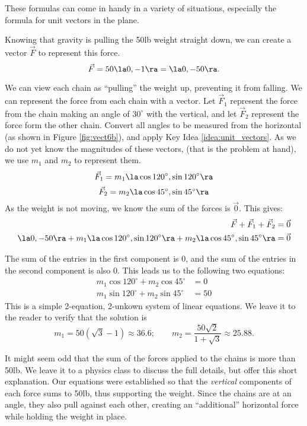 These formulas can come in handy in a variety of situations, especially the formula for unit vectors in the plane.



{Knowing that gravity is pulling the 50lb weight straight down, we can create a vector $\vec F$ to represent this force. 
$$\vec F = 50\la 0,-1\ra = \la 0,-50\ra.$$

We can view each chain as ``pulling'' the weight up, preventing it from falling. We can represent the force from each chain with a vector. Let $\vec F_1$ represent the force from the chain making an angle of $30^\circ$ with the vertical, and let $\vec F_2$ represent the force form the other chain. Convert all angles to be measured from the horizontal (as shown in Figure \ref{fig:vect6b}), and apply Key Idea \ref{idea:unit_vectors}. As we do not yet know the magnitudes of these vectors, (that is the problem at hand), we use $m_1$ and $m_2$ to represent them.
$$\vec F_1 = m_1\la \cos 120^\circ,\sin120^\circ\ra$$
$$\vec F_2 = m_2\la \cos 45^\circ,\sin45^\circ\ra$$
As the weight is not moving, we know the sum of the forces is $\vec 0$. This gives:
\begin{align*}
\vec F + \vec F_1 + \vec F_2 & = \vec 0\\
\la 0,-50\ra + m_1\la \cos 120^\circ,\sin120^\circ\ra + m_2\la \cos 45^\circ,\sin45^\circ\ra &=\vec 0
\end{align*}

The sum of the entries in the first component is 0, and the sum of the entries in the second component is also 0. This leads us to the following two equations:
\begin{align*}
m_1\cos120^\circ + m_2\cos45^\circ &=0 \\
m_1\sin120^\circ + m_2\sin45^\circ &=50
\end{align*}
This is a simple 2-equation, 2-unkown system of linear equations. We leave it to the reader to verify that the solution is 
$$m_1=50(\sqrt{3}-1) \approx 36.6;\qquad m_2=\frac{50\sqrt{2}}{1+\sqrt{3}} \approx 25.88.$$

It might seem odd that the sum of the forces applied to the chains is more than 50lb. We leave it to a physics class to discuss the full details, but offer this short explanation. Our equations were established so that the \textit{vertical} components of each force sums to 50lb, thus supporting the weight. Since the chains are at an angle, they also pull against each other, creating an ``additional'' horizontal force while holding the weight in place.}

